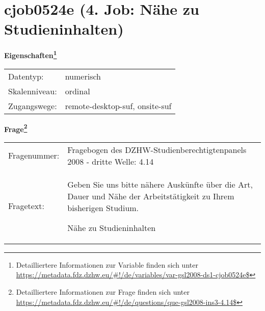 
    \setcounter{footnote}{0}

    \vspace*{-1.8cm}
	\section{cjob0524e (4. Job: Nähe zu Studieninhalten)}
	\label{section:cjob0524e}



    \vspace*{0.5cm}
    \noindent\textbf{Eigenschaften\footnote{Detailliertere Informationen zur Variable finden sich unter
		\url{https://metadata.fdz.dzhw.eu/\#!/de/variables/var-gsl2008-ds1-cjob0524e$}}}\\
	\begin{tabularx}{\hsize}{@{}lX}
	Datentyp: & numerisch \\
	Skalenniveau: & ordinal \\
	Zugangswege: &
	  remote-desktop-suf, 
	  onsite-suf
 \\
    \end{tabularx}



				\vspace*{0.5cm}
                \noindent\textbf{Frage\footnote{Detailliertere Informationen zur Frage finden sich unter
		              \url{https://metadata.fdz.dzhw.eu/\#!/de/questions/que-gsl2008-ins3-4.14$}}}\\
				\begin{tabularx}{\hsize}{@{}lX}
					Fragenummer: &
					  Fragebogen des DZHW-Studienberechtigtenpanels 2008 - dritte Welle:
					  4.14
 \\
					Fragetext: & Geben Sie uns bitte nähere Auskünfte über die Art, Dauer und Nähe der Arbeitstätigkeit zu Ihrem bisherigen Studium.\par  Nähe zu Studieninhalten \\
				\end{tabularx}





